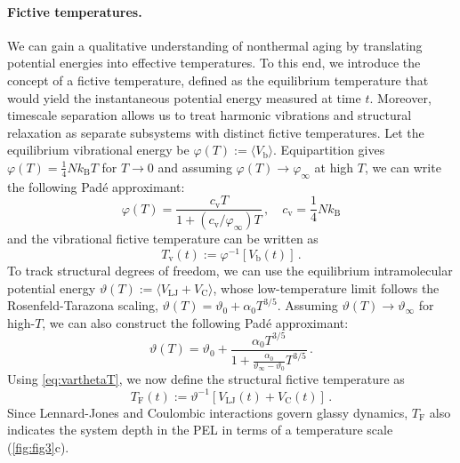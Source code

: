 \documentclass[%
 reprint,
 amsmath,amssymb,
 aps,
]{revtex4-2}
\begin{document}
\paragraph*{Fictive temperatures.} We can gain a qualitative understanding of nonthermal aging by translating potential energies into effective temperatures.
To this end, we introduce the concept of a fictive temperature, defined as the equilibrium temperature that would yield the instantaneous potential energy measured at time $t$.
Moreover, timescale separation allows us to treat harmonic vibrations and structural relaxation as separate subsystems with distinct fictive temperatures.
Let the equilibrium vibrational energy be $\varphi(T):= \langle V_\mathrm{b} \rangle $. Equipartition gives $\varphi(T) = \frac{1}{4} N k_\mathrm{B} T$ for $T \to 0$ and assuming $\varphi(T) \to \varphi_\infty$ at high $T$, we can write the following Pad\'e approximant:
\begin{equation}
    \varphi(T) = \frac{c_\mathrm{v} T}{1+(c_\mathrm{v} /\varphi_\infty)T  } \,, \quad c_\mathrm{v}=\frac{1}{4} N k_\mathrm{B}
\end{equation}
and the vibrational fictive temperature can be written as
\begin{equation}
T_\mathrm{v}(t) := \varphi^{-1}[V_\mathrm{b}(t)] \,. \label{eq:Tv}
\end{equation}
To track structural degrees of freedom, we can use the equilibrium intramolecular potential energy  $\vartheta(T) :=\langle V_\mathrm{LJ}+V_\mathrm{C}\rangle $, whose low-temperature limit follows the Rosenfeld-Tarazona scaling, $\vartheta(T) = \vartheta_0+\alpha_0 T^{3/5}$. 
Assuming $\vartheta(T) \to \vartheta_\infty$ for high-$T$, we can also construct the following Pad\'e approximant: %
\begin{equation}
\vartheta(T) = \vartheta_0+\frac{\alpha_0 T^{3/5}}{1+\frac{\alpha_0}{\vartheta_\infty-\vartheta_0}T^{3/5}} \,. \label{eq:varthetaT}
\end{equation}
Using \cref{eq:varthetaT}, we now define the structural fictive temperature as
\begin{equation}
T_\mathrm{F}(t) := \vartheta^{-1}[V_\mathrm{LJ}(t)+V_\mathrm{C}(t)] \,.
\end{equation}
Since Lennard-Jones and Coulombic interactions govern glassy dynamics, $T_\mathrm{F}$ also indicates the system depth in the PEL in terms of a temperature scale (\cref{fig:fig3}c).
\end{document}
